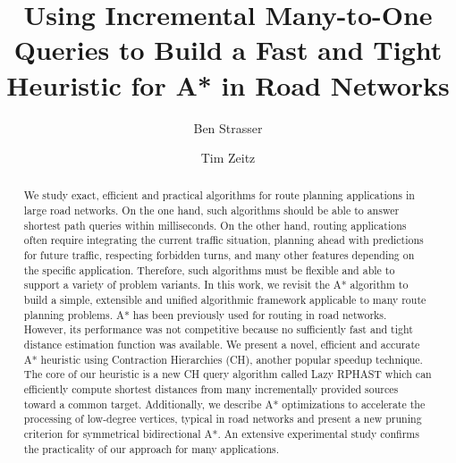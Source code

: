 \documentclass[manuscript]{acmart}
\begin{document}
\title{Using Incremental Many-to-One Queries to Build a Fast and Tight Heuristic for A* in Road Networks}

\author{Ben Strasser}

\author{Tim Zeitz}


\renewcommand{\shortauthors}{B. Strasser and T. Zeitz}


\begin{abstract}
We study exact, efficient and practical algorithms for route planning applications in large road networks.
On the one hand, such algorithms should be able to answer shortest path queries within milliseconds.
On the other hand, routing applications often require integrating the current traffic situation, planning ahead with predictions for future traffic, respecting forbidden turns, and many other features depending on the specific application.
Therefore, such algorithms must be flexible and able to support a variety of problem variants.
In this work, we revisit the A* algorithm to build a simple, extensible and unified algorithmic framework applicable to many route planning problems.
A* has been previously used for routing in road networks.
However, its performance was not competitive because no sufficiently fast and tight distance estimation function was available.
We present a novel, efficient and accurate A* heuristic using Contraction Hierarchies (CH), another popular speedup technique.
The core of our heuristic is a new CH query algorithm called Lazy RPHAST which can efficiently compute shortest distances from many incrementally provided sources toward a common target.
Additionally, we describe A* optimizations to accelerate the processing of low-degree vertices, typical in road networks and present a new pruning criterion for symmetrical bidirectional A*.
An extensive experimental study confirms the practicality of our approach for many applications.
\end{abstract}
\end{document}
